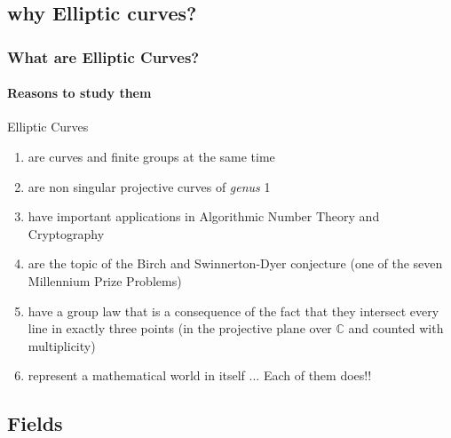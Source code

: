 \documentclass[10pt,handout]{beamer} %
\newcommand{\C}{\mathbb C}
\theoremstyle{definition}
\begin{document}
\begin{frame}
\begin{columns}[c]
\begin{column}{8cm}
\end{column}
\end{columns}
\end{frame}

\subsection{why Elliptic curves?}
\begin{frame}\frametitle{What are Elliptic Curves?}
\framesubtitle{Reasons to study them}\pause

Elliptic Curves
\begin{enumerate}[<+-| alert@+>]
\item are curves and finite groups at the same time
\item are non singular projective curves of \emph{genus} 1
\item have important applications in Algorithmic Number Theory and Cryptography
\item are the topic of the \alert{Birch and Swinnerton-Dyer conjecture} (one of the seven Millennium Prize Problems)
\item have a group law that is a consequence of the fact that they intersect every line in
exactly three points (in the projective plane over $\C$ and counted with multiplicity)
\item represent a mathematical world in itself ... Each of them does!!
\end{enumerate}
\end{frame}

\subsection{Fields}
\end{document}

